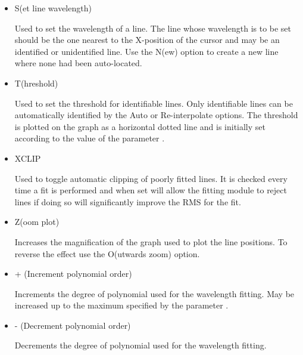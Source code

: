 \begin{itemize}
\begin{itemize}
      \item {\sunspec{\Large\tt}{\bf} S}(et line wavelength)

            Used to set the
            wavelength of a line. The line whose wavelength is to be set
            should be the one nearest to the X-position of the cursor and
            may be an identified or unidentified line. Use the N(ew) option
            to create a new line where none had been auto-located.

      \item {\sunspec{\Large\tt}{\bf} T}(hreshold)

            Used to set the threshold for
            identifiable lines. Only identifiable lines can be
            automatically identified by the Auto or Re-interpolate options.
            The threshold is plotted on the graph as a horizontal dotted
            line and is initially set according to the value of the
            parameter \@.

      \item {\sunspec{\Large\tt}{\bf} XCLIP}

            Used to toggle automatic clipping of
            poorly fitted lines.  It is checked every time a fit is
            performed and when set will allow the fitting module to reject
            lines if doing so will significantly improve the RMS for the
            fit.

      \item {\sunspec{\Large\tt}{\bf} Z}(oom plot)

            Increases the magnification of the
            graph used to plot the line positions. To reverse the effect
            use the O(utwards zoom) option.

      \item {\sunspec{\Large\tt}{\bf} +} (Increment polynomial order)

            Increments the degree
            of polynomial used for the wavelength fitting. May be increased
            up to the maximum specified by the parameter
            \@.

      \item {\sunspec{\Large\tt}{\bf} -} (Decrement polynomial order)

            Decrements the degree
            of polynomial used for the wavelength fitting.


\end{itemize}
\end{itemize}
